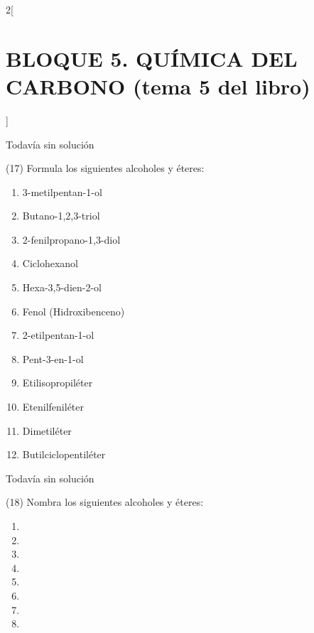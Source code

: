 \documentclass[10pt]{article}
\begin{document}
\begin{multicols}{2}[
  \section{BLOQUE 5. QUÍMICA DEL CARBONO (tema 5 del libro)}
  ]
\begin{solution}[print=false]
  Todavía sin solución
\end{solution}




\begin{exercise}[
    tags    = {},
    topics  = {química, química orgánica, orgánica},
    source  = {FQ 1B MGH 2016, p135, e17},
  ]
  (17) Formula los siguientes alcoholes y éteres:
  \begin{enumerate}
    \item 3-metilpentan-1-ol
    \item Butano-1,2,3-triol
    \item 2-fenilpropano-1,3-diol
    \item Ciclohexanol
    \item Hexa-3,5-dien-2-ol
    \item Fenol (Hidroxibenceno)
    \item 2-etilpentan-1-ol
    \item Pent-3-en-1-ol
    \item Etilisopropiléter
    \item Etenilfeniléter
    \item Dimetiléter
    \item Butilciclopentiléter
  \end{enumerate}
\end{exercise}

\begin{solution}[print=false]
  Todavía sin solución
\end{solution}




\begin{exercise}[
    tags    = {},
    topics  = {química, química orgánica, orgánica},
    source  = {FQ 1B MGH 2016, p135, e18},
  ]
  (18) Nombra los siguientes alcoholes y éteres:
  \begin{enumerate}
    \item {}
    \item {}
    \item {}
    \item {}
    \item {}
    \item {}
    \item {}
    \item {}
  \end{enumerate}
\end{exercise}


\end{multicols}
\end{document}
